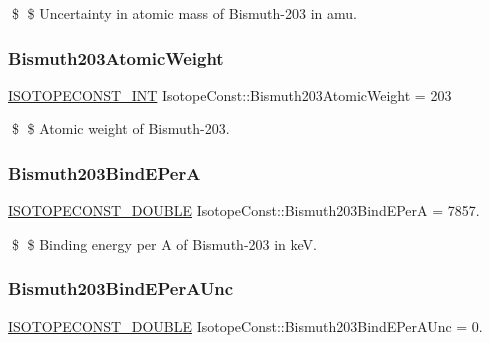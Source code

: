 \$ \$ Uncertainty in atomic mass of Bismuth-\/203 in amu. \mbox{\label{group___isotope_const-_bismuth-_bi203_ga12326688b201255b93b67334c9b969a6}} 
\subsubsection{\texorpdfstring{Bismuth203\+Atomic\+Weight}{Bismuth203AtomicWeight}}
{\footnotesize\ttfamily \mbox{\hyperlink{group___isotope_const-_macros_ga5f18360b3e99483a35c32d789e62621c}{I\+S\+O\+T\+O\+P\+E\+C\+O\+N\+S\+T\+\_\+\+I\+NT}} Isotope\+Const\+::\+Bismuth203\+Atomic\+Weight = 203}

\$ \$ Atomic weight of Bismuth-\/203. \mbox{\label{group___isotope_const-_bismuth-_bi203_ga4c4bad5a4a26cbe543077680e9b9443c}} 
\subsubsection{\texorpdfstring{Bismuth203\+Bind\+E\+PerA}{Bismuth203BindEPerA}}
{\footnotesize\ttfamily \mbox{\hyperlink{group___isotope_const-_macros_ga8f45a7272ce02c0b4c65c44636ed719a}{I\+S\+O\+T\+O\+P\+E\+C\+O\+N\+S\+T\+\_\+\+D\+O\+U\+B\+LE}} Isotope\+Const\+::\+Bismuth203\+Bind\+E\+PerA = 7857.}

\$ \$ Binding energy per A of Bismuth-\/203 in keV. \mbox{\label{group___isotope_const-_bismuth-_bi203_gab907beec8525c7a2049be4fbb7d615ee}} 
\subsubsection{\texorpdfstring{Bismuth203\+Bind\+E\+Per\+A\+Unc}{Bismuth203BindEPerAUnc}}
{\footnotesize\ttfamily \mbox{\hyperlink{group___isotope_const-_macros_ga8f45a7272ce02c0b4c65c44636ed719a}{I\+S\+O\+T\+O\+P\+E\+C\+O\+N\+S\+T\+\_\+\+D\+O\+U\+B\+LE}} Isotope\+Const\+::\+Bismuth203\+Bind\+E\+Per\+A\+Unc = 0.}

